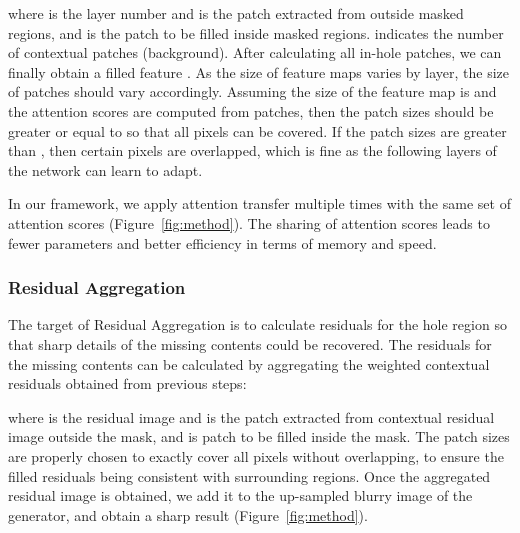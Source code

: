 \documentclass[oribibl]{llncs}  \usepackage[width=122mm,left=12mm,paperwidth=146mm,height=193mm,top=12mm,paperheight=217mm]{geometry}
\begin{document}
\noindent where  is the layer number and  is the  patch extracted from  outside masked regions, and  is the  patch to be filled inside masked regions.  indicates the number of contextual patches (background). After calculating all in-hole patches, we can finally obtain a filled feature . As the size of feature maps varies by layer, the size of patches should vary accordingly. Assuming the size of the feature map is  and the attention scores are computed from  patches, then the patch sizes should be greater or equal to  so that all pixels can be covered. If the patch sizes are greater than , then certain pixels are overlapped, which is fine as the following layers of the network can learn to adapt. 

 In our framework, we apply attention transfer multiple times with the same set of attention scores (Figure~\ref{fig:method}). The sharing of attention scores leads to fewer parameters and better efficiency in terms of memory and speed.

\subsubsection{Residual Aggregation}
The target of Residual Aggregation is to calculate residuals for the hole region so that sharp details of the missing contents could be recovered. The residuals for the missing contents can be calculated by aggregating the weighted contextual residuals obtained from previous steps:



\noindent where  is the residual image and  is the  patch extracted from contextual residual image outside the mask, and  is  patch to be filled inside the mask. The patch sizes are properly chosen to exactly cover all pixels without overlapping, to ensure the filled residuals being consistent with surrounding regions. Once the aggregated residual image is obtained, we add it to the up-sampled blurry image of the generator, and obtain a sharp result (Figure~\ref{fig:method}).
\end{document}
